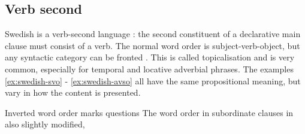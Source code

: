 \documentclass{report}
\begin{document}
\subsection{Verb second}
Swedish is a verb-second language \cite[p.116]{gunlog}: the
second constituent of a declarative main clause must consist of a verb.
The normal word order is subject-verb-object, but any syntactic category can be
fronted \cite[]{H&H}.
This is called topicalisation and is very common, especially for temporal and
locative adverbial phrases.
The examples \ref{ex:swedish-svo} - \ref{ex:swedish-avso} all have the same propositional
meaning, but vary in how the content is presented.
 \label{ex:swedish-svo}
\vspace{-3mm}
\label{ex:swedish-ovs} 
\vspace{-3mm}
 \label{ex:swedish-avso}


Inverted word order marks questions
The word order in subordinate clauses in also slightly modified,
\end{document}
